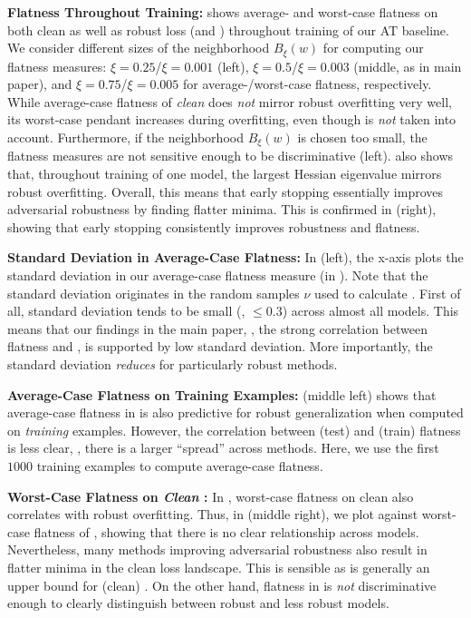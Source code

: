 \textbf{Flatness Throughout Training:}
%
 shows average- and worst-case flatness on both clean as well as robust loss (\CE and \RCE) throughout training of our AT baseline. We consider different sizes of the neighborhood $B_\xi(w)$ for computing our flatness measures: $\xi{=}0.25$/$\xi{=}0.001$ (left), $\xi{=}0.5$/$\xi{=}0.003$ (middle, as in main paper), and $\xi{=}0.75$/$\xi{=}0.005$ for average-/worst-case flatness, respectively. While average-case flatness of \emph{clean} \CE does \emph{not} mirror robust overfitting very well, its worst-case pendant increases during overfitting, even though \RCE is \emph{not} taken into account. Furthermore, if the neighborhood $B_\xi(w)$ is chosen too small, the flatness measures are not sensitive enough to be discriminative (\cf left).  also shows that, throughout training of one model, the largest Hessian eigenvalue mirrors robust overfitting. Overall, this means that early stopping essentially improves adversarial robustness by finding flatter minima. This is confirmed in  (right), showing that early stopping consistently improves robustness and flatness.

\textbf{Standard Deviation in Average-Case Flatness:} 
%
In  (left), the x-axis plots the standard deviation in our average-case flatness measure (in \RCE). Note that the standard deviation originates in the random samples $\nu$ used to calculate . First of all, standard deviation tends to be small (\ie, $\leq 0.3$) across almost all models. This means that our findings in the main paper, \ie, the strong correlation between flatness and \RCE, is supported by low standard deviation. More importantly, the standard deviation \emph{reduces} for particularly robust methods.

\textbf{Average-Case Flatness on Training Examples:}
%
 (middle left) shows that average-case flatness in \RCE is also predictive for robust generalization when computed on \emph{training} examples. However, the correlation between (test) \RCE and (train) flatness is less clear, \ie, there is a larger ``spread'' across methods. Here, we use the first $1000$ training examples to compute average-case flatness.

\textbf{Worst-Case Flatness on \emph{Clean} \CE:}
%
In , worst-case flatness on clean \CE also correlates with robust overfitting. Thus, in  (middle right), we plot \RCE against worst-case flatness of \CE, showing that there is no clear relationship across models. Nevertheless, many methods improving adversarial robustness also result in flatter minima in the clean loss landscape. This is sensible as \RCE is generally an upper bound for (clean) \CE. On the other hand, flatness in \CE is \emph{not} discriminative enough to clearly distinguish between robust and less robust models.

